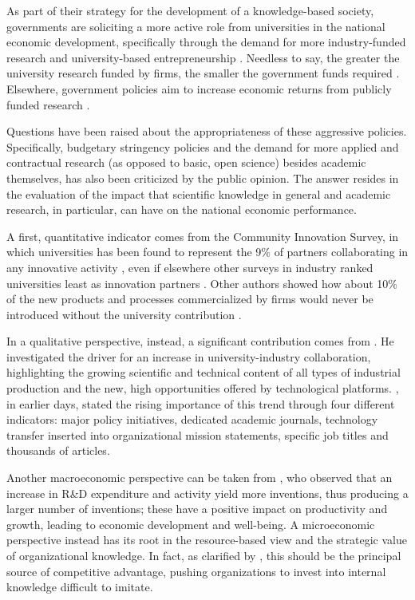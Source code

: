 As part of their strategy for the development of a knowledge-based society, governments are soliciting a more active role from universities in the national economic development, specifically through the demand for more industry-funded research \citep{Geuna2009} and university-based entrepreneurship \citep{OShea2004}. Needless to say, the greater the university research funded by firms, the smaller the government funds required \citep{Yusuf2008}. Elsewhere, government policies aim to increase economic returns from publicly funded research \citep{Bercovitz2006}.

Questions have been raised about the appropriateness of these aggressive policies. Specifically, budgetary stringency policies and the demand for more applied and contractual research (as opposed to basic, open science) besides academic themselves, has also been criticized by the public opinion. The answer resides in the evaluation of the impact that scientific knowledge in general and academic research, in particular, can have on the national economic performance.

A first, quantitative indicator comes from the Community Innovation Survey, in which universities has been found to represent the 9\% of partners collaborating in any innovative activity \citep{Muscio2008}, even if elsewhere other surveys in industry ranked universities least as innovation partners \citep{Yusuf2008}. Other authors showed how about 10\% of the new products and processes commercialized by firms would never be introduced without the university contribution \citep{Bekkers2008}. 

In a qualitative perspective, instead, a significant contribution comes from \citet{Bercovitz2006}. He investigated the driver for an increase in university-industry collaboration, highlighting the growing scientific and technical content of all types of industrial production and the new, high opportunities offered by technological platforms. \citet{Bozeman2000}, in earlier days, stated the rising importance of this trend through four different indicators: major policy initiatives, dedicated academic journals, technology transfer inserted into organizational mission statements, specific job titles and thousands of articles. 

Another macroeconomic perspective can be taken from \citet{Markman2005}, who observed that an increase in R\&D expenditure and activity yield more inventions, thus producing a larger number of inventions; these have a positive impact on productivity and growth, leading to economic development and well-being. A microeconomic perspective instead has its root in the resource-based view \citep{Wernerfelt1984} and the strategic value of organizational knowledge. In fact, as clarified by \citet{Argote2000}, this should be the principal source of competitive advantage, pushing organizations to invest into internal knowledge difficult to imitate.

